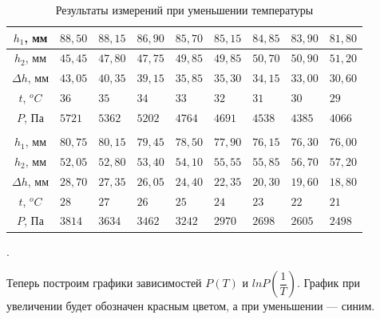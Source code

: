 \documentclass[a4paper, 12pt]{article}
\newcounter{Points}
\newcommand{\point}{\arabic{Points}. \addtocounter{Points}{1}}
\begin{document}
\begin{table}[!h]
    \begin{tabularx}{\linewidth}{|c|X|X|X|X|X|X|X|X|}
        \hline
        $h_1$, мм & $88,50$ & $88,15$ & $86,90$ & $85,70$ & $85,15$ & $84,85$ & $83,90$ & $81,80$ \\ \hline

        $h_2$, мм & $45,45$ & $47,80$ & $47,75$ & $49,85$ & $49,85$ & $50,70$ & $50,90$ & $51,20$ \\ \hline

        $\Delta h$, мм & $43,05$ & $40,35$ & $39,15$ & $35,85$ & $35,30$ & $34,15$ & $33,00$ & $30,60$ \\ \hline

        $t$, $^o C$ & $36$ & $35$ & $34$ & $33$ & $32$ & $31$ & $30$ & $29$ \\ \hline 
        
        $P$, Па & $5721$ & $5362$ & $5202$ & $4764$ & $4691$ & $4538$ & $4385$ & $4066$
        \\ \hline \multicolumn{9}{c}{} \\ \hline

        $h_1$, мм & $80,75$ & $80,15$ & $79,45$ & $78,50$ & $77,90$ & $76,15$ & $76,30$ & $76,00$ \\ \hline

        $h_2$, мм & $52,05$ & $52,80$ & $53,40$ & $54,10$ & $55,55$ & $55,85$ & $56,70$ & $57,20$ \\ \hline
        
        $\Delta h$, мм & $28,70$ & $27,35$ & $26,05$ & $24,40$ & $22,35$ & $20,30$ & $19,60$ & $18,80$ \\ \hline

        $t$, $^o C$ & $28$ & $27$ & $26$ & $25$ & $24$ & $23$ & $22$ & $21$ \\ \hline

        $P$, Па & $3814$ & $3634$ & $3462$ & $3242$ & $2970$ & $2698$ & $2605$ & $2498$ \\ \hline
    \end{tabularx}
\caption{Результаты измерений при уменьшении температуры}
\label{tabl:down}
\end{table}

\point Теперь построим графики зависимостей $P (T)$ и $ln P \left(\dfrac{1}{T} \right)$. График при увеличении будет обозначен красным цветом, а при уменьшении --- синим. 
\end{document}
